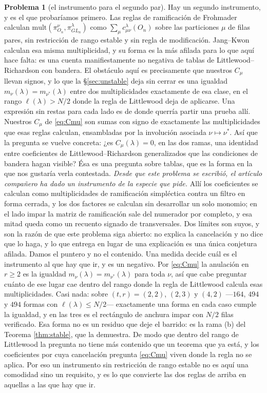 \documentclass[11pt,reqno]{amsart}
\newcommand{\stverif}{\textcolor{hverif}{\small verificado}}
\theoremstyle{plain}
\theoremstyle{definition}
\newtheorem{problem}[theorem]{Problema}
\begin{document}
\begin{problem}[el instrumento para el segundo par]
Hay un segundo instrumento, y es el que probaríamos primero. Las reglas de ramificación de Frohmader
\cite{Frohmader} calculan $\mathrm{mult}(\pi^{\nu}_{O_n},\pi^{\lambda}_{GL_n})$ como
$\sum_{\mu}c^{\lambda}_{\mu\nu}(O_n)$ sobre las particiones $\mu$ de filas pares, sin restricción de
rango estable y sin regla de modificación. Jang--Kwon \cite{JK20} calculan esa misma multiplicidad,
y su forma es la más afilada para lo que aquí hace falta: es una cuenta manifiestamente no negativa
de tablas de Littlewood--Richardson con bandera. El obstáculo aquí es precisamente que nuestros
$C_\mu$ llevan signos, y lo que la \S\ref{sec:unstable} deja sin cerrar es una igualdad
$m_\nu(\lambda)=m_{\nu^{*}}(\lambda)$ entre dos multiplicidades exactamente de esa clase, en el
rango $\ell(\lambda)>N/2$ donde la regla de Littlewood deja de aplicarse. Una expresión sin restas
para cada lado es de donde querría partir una prueba allí. Nuestros $C_\mu$ de \eqref{eq:Cmu} son
sumas con signo de
exactamente las multiplicidades que esas reglas calculan, ensambladas por la involución asociada
$\nu\mapsto\nu^{*}$. Así que la pregunta se vuelve concreta: ¿es $C_\mu(\lambda)=0$, en las dos
ramas, una identidad entre coeficientes de Littlewood--Richardson generalizados que las condiciones
de bandera hagan visible? Ésa es una pregunta sobre tablas, que es la forma en la que nos gustaría
verla contestada.
\emph{Desde que este problema se escribió, el artículo compañero \cite{PaperII} ha dado un
instrumento de la especie que pide.} Allí los coeficientes se calculan como multiplicidades de
ramificación simpléctica contra un filtro en forma cerrada, y los dos factores se calculan sin
desarrollar un solo monomio; en el lado impar la matriz de ramificación sale del numerador por
completo, y esa mitad queda como un recuento signado de transversales. Dos límites son suyos, y son
la razón de que este problema siga abierto: no explica la cancelación y no dice que lo haga, y lo
que entrega en lugar de una explicación es una única conjetura afilada. Damos el puntero y no el
contenido.
Una medida decide cuál es el instrumento al que hay que ir, y es un negativo. Por \eqref{eq:Cmu} la
anulación en $r\ge2$ es la igualdad $m_\nu(\lambda)=m_{\nu^{*}}(\lambda)$ para toda $\nu$, así que
cabe preguntar cuánto de ese lugar cae dentro del rango donde la regla de Littlewood calcula esas
multiplicidades. Casi nada: sobre $(t,r)=(2,2)$, $(2,3)$ y $(4,2)$ ---$164$, $494$ y $494$ formas con
$\ell(\lambda)\le N/2$--- exactamente una forma en cada caso cumple la igualdad, y en las tres es el
rectángulo de anchura impar con $N/2$ filas \stverif. Esa forma no es un residuo que deje el
barrido: es la rama (b) del Teorema \ref{thm:stable}, que la demuestra. De modo que dentro del rango
de Littlewood la pregunta no tiene más contenido que un teorema que ya está, y los coeficientes por
cuya cancelación pregunta \eqref{eq:Cmu} viven donde la regla no se aplica. Por eso un instrumento
sin restricción de rango estable no es aquí una comodidad sino un requisito, y es lo que convierte
las dos reglas de arriba en aquellas a las que hay que ir.
\end{problem}
\end{document}
